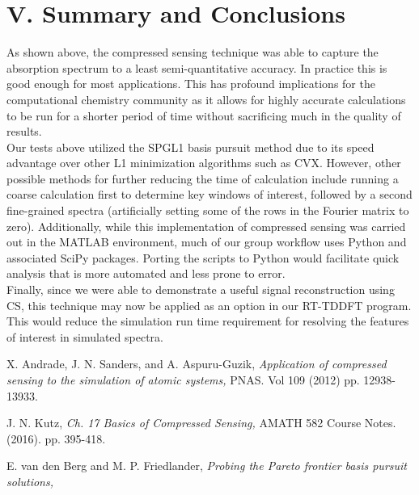 \documentclass[11pt]{article}
\begin{document}
\pagebreak



\section*{V.	Summary and Conclusions} %

\par As shown above, the compressed sensing technique was able to capture the absorption spectrum to a least semi-quantitative accuracy. In practice this is good enough for most applications. This has profound implications for the computational chemistry community as it allows for highly accurate calculations to be run for a shorter period of time without sacrificing much in the quality of results.\\ 

Our tests above utilized the SPGL1 basis pursuit method due to its speed advantage over other L1 minimization algorithms such as CVX. However, other possible methods for further reducing the time of calculation include running a coarse calculation first to determine key windows of interest, followed by a second fine-grained spectra (artificially setting some of the rows in the Fourier matrix to zero). Additionally, while this implementation of compressed sensing was carried out in the MATLAB environment, much of our group workflow uses Python and associated SciPy packages. Porting the scripts to Python would facilitate quick analysis that is more automated and less prone to error.\\

Finally, since we were able to demonstrate a useful signal reconstruction using CS, this technique may now be applied as an option in our RT-TDDFT program.  This would reduce the simulation run time requirement for resolving the features of interest in simulated spectra.\\ 


\pagebreak

\begin{thebibliography}{9}
\setlength{\itemsep}{-2mm}\footnotesize{

 X. Andrade, J. N. Sanders, and A. Aspuru-Guzik, \textit{Application of compressed sensing to the simulation of atomic systems,} PNAS. Vol 109 (2012) pp. 12938-13933.

 J. N. Kutz, \textit{Ch. 17 Basics of Compressed Sensing,} AMATH 582 Course Notes. (2016). pp. 395-418.

 E. van den Berg and M. P. Friedlander, \textit{Probing the Pareto frontier basis pursuit solutions,}

}\end{thebibliography}
\end{document}
